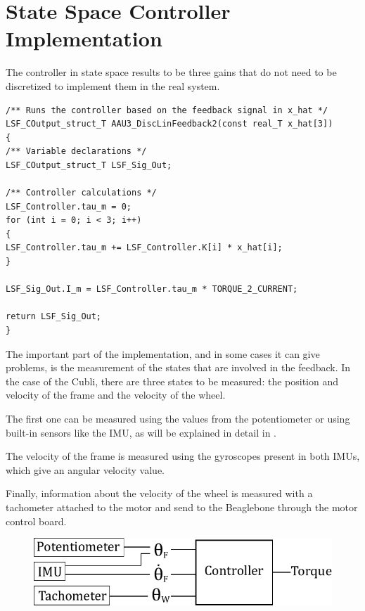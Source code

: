 \section{State Space Controller Implementation}\label{sec:SSImplementation}
The controller in state space results to be three gains that do not need to be discretized to implement them in the real system.  
\begin{lstlisting}[caption  = {Code for the implementation of the State Space Controller. The feedback from the cubli is contained in the array x\_hat.},
label    = codeStateSpaceControl ]
/** Runs the controller based on the feedback signal in x_hat */
LSF_COutput_struct_T AAU3_DiscLinFeedback2(const real_T x_hat[3])
{
/** Variable declarations */
LSF_COutput_struct_T LSF_Sig_Out;

/** Controller calculations */
LSF_Controller.tau_m = 0;
for (int i = 0; i < 3; i++)
{
LSF_Controller.tau_m += LSF_Controller.K[i] * x_hat[i];
}

LSF_Sig_Out.I_m = LSF_Controller.tau_m * TORQUE_2_CURRENT;

return LSF_Sig_Out;
}
\end{lstlisting}
The important part of the implementation, and in some cases it can give problems, is the measurement of the states that are involved in the feedback.
In the case of the Cubli, there are three states to be measured: the position and velocity of the frame and the velocity of the wheel.

The first one can be measured using the values from the potentiometer or using built-in sensors like the IMU, as will be explained in detail in .

The velocity of the frame is measured using the gyroscopes present in both IMUs, which give an angular velocity value.

Finally, information about the velocity of the wheel is measured with a tachometer attached to the motor and send to the Beaglebone through the motor control board. 
\\
\begin{figure}[H]\vspace{-4mm}
	\centering
	\includegraphics[scale=.75]{figures/measurements}
	\label{fig:measurements}
\end{figure}\vspace{-5mm}
